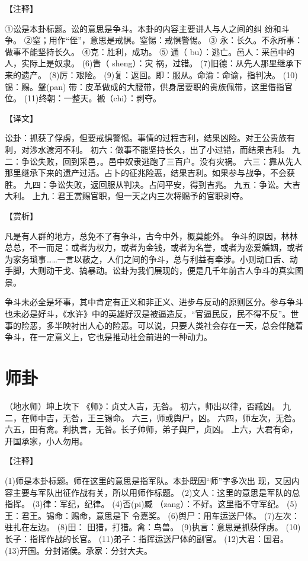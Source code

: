 \documentclass[12pt,UTF8]{ctexbook}
\begin{document}
【注释】

①讼是本卦标题。讼的意思是争斗。本卦的内容主要讲人与人之间的纠 纷和斗争。
②窒；用作“侄”，意思是戒惧。窒惕：戒惧警惕。
③ 永：长久。不永所事：做事不能坚持长久。
④克：胜利，成功。
⑤ 通（ bu）：逃亡。邑人：采邑中的人，实际上是奴隶。
(6)眚（ sheng）：灾 祸，过错。
(7)旧德：从先人那里继承下来的遗产。
(8)厉：艰险。
(9)复：返回。即：服从。命渝：命谕，指判决。
(10)锡：赐。鞶(pan) 带：皮革做成的大腰带，供身居要职的贵族佩带，这里借指官位。
(11)终朝：一整天。褫（chi）：剥夺。

【译文】

讼卦：抓获了俘虏，但要戒惧警惕。事情的过程吉利，结果凶险。对王公贵族有利，对涉水渡河不利。
初六：做事不能坚持长久，出了小过错，而结果吉利。
九二：争讼失败，回到采邑，。邑中奴隶逃跑了三百户。没有灾祸。
六三：靠从先人那里继承下来的遗产过活。占卜的征兆险恶，结果吉利。如果参与战争，不会获胜。
九四：争讼失败，返回服从判决。占问平安，得到吉兆。
九五：争讼。大吉大利。
上九：君王赏赐官职，但一天之内三次将赐予的官职剥夺。

【赏析】

凡是有人群的地方，总免不了有争斗，古今中外，概莫能外。 争斗的原因，林林总总，不一而足：或者为权力，或者为金钱，或者为名誉，或者为恋爱婚姻，或者为家务琐事……一言以蔽之，人们之间的争斗，总与利益有牵涉。小则动口舌、动手脚，大则动干戈、搞暴动。讼卦为我们展现的，便是几千年前古人争斗的真实图景。

争斗未必全是坏事，其中肯定有正义和非正义、进步与反动的原则区分。参与争斗也未必是好斗，《水许》中的英雄好汉是被逼造反，“官逼民反，民不得不反”。世事的险恶，多半映衬出人心的险恶。可以说，只要人类社会存在一天，总会伴随着争斗，在一定意义上，它也是推动社会前进的一种动力。

\chapter{师卦}

（地水师）坤上坎下
《师》：贞丈人吉，无咎。
初六，师出以律，否臧凶。
九二，在师中吉，无咎，王三锡命。
六三，师或舆尸，凶。
六四，师左次，无咎。
六五，田有禽。利执言，无咎。长子帅师，弟子舆尸，贞凶。
上六，大君有命，开国承家，小人勿用。

【注释】

(1)师是本卦标题。师在这里的意思是指军队。本卦既因“师”字多次出 现，又因内容主要与军队出征作战有关，所以用师作标题。
(2)文人：这里的意思是军队的总指挥。
(3)律：军纪，纪律。
(4)否(pi)臧 （zang）：不好。这里指不守军纪。
(5)王：君王。锡命：赐命，意思是下 令嘉奖。
(6)舆尸：用车运送尸体。
(7)左次：驻扎在左边。
(8)田： 田猎，打猎。禽：鸟兽。
(9)执言：意思是抓获俘虏。
(10)长子：指挥作战的长官。
(11)弟子：指挥运送尸体的副官。
(12)大君：国君。
(13)开国。分封诸侯。承家：分封大夫。
\end{document}
